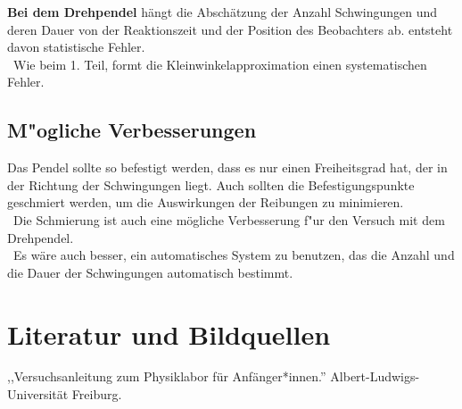 \documentclass[11pt,a4paper]{article} %
\begin{document}
\textbf{Bei dem Drehpendel} hängt die Abschätzung der Anzahl Schwingungen und deren Dauer von der Reaktionszeit und der Position des Beobachters ab. entsteht davon statistische Fehler.
\\\
Wie beim 1. Teil, formt die Kleinwinkelapproximation einen systematischen Fehler.
\subsection{ M"ogliche Verbesserungen}
Das Pendel sollte so befestigt werden, dass es nur einen Freiheitsgrad hat, der in der Richtung der Schwingungen liegt. Auch sollten die Befestigungspunkte geschmiert werden, um die Auswirkungen der Reibungen zu minimieren.
\\\
Die Schmierung ist auch eine mögliche Verbesserung f"ur den Versuch mit dem Drehpendel.
\\\
Es wäre auch besser, ein automatisches System zu benutzen, das die Anzahl und die Dauer der Schwingungen automatisch bestimmt.
\section{Literatur und Bildquellen}
,,Versuchsanleitung zum Physiklabor für Anfänger*innen.'' Albert-Ludwigs-Universität Freiburg. 
\end{document}
